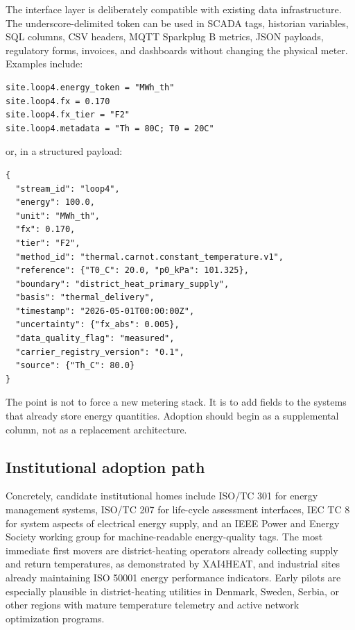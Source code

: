 \documentclass[11pt]{article}
\begin{document}
The interface layer is deliberately compatible with existing data infrastructure. The underscore-delimited token can be used in SCADA tags, historian variables, SQL columns, CSV headers, MQTT Sparkplug B metrics, JSON payloads, regulatory forms, invoices, and dashboards without changing the physical meter. Examples include:

\begin{verbatim}
site.loop4.energy_token = "MWh_th"
site.loop4.fx = 0.170
site.loop4.fx_tier = "F2"
site.loop4.metadata = "Th = 80C; T0 = 20C"
\end{verbatim}

or, in a structured payload:
\begin{verbatim}
{
  "stream_id": "loop4",
  "energy": 100.0,
  "unit": "MWh_th",
  "fx": 0.170,
  "tier": "F2",
  "method_id": "thermal.carnot.constant_temperature.v1",
  "reference": {"T0_C": 20.0, "p0_kPa": 101.325},
  "boundary": "district_heat_primary_supply",
  "basis": "thermal_delivery",
  "timestamp": "2026-05-01T00:00:00Z",
  "uncertainty": {"fx_abs": 0.005},
  "data_quality_flag": "measured",
  "carrier_registry_version": "0.1",
  "source": {"Th_C": 80.0}
}
\end{verbatim}

The point is not to force a new metering stack. It is to add fields to the systems that already store energy quantities. Adoption should begin as a supplemental column, not as a replacement architecture.

\subsection{Institutional adoption path}

Concretely, candidate institutional homes include ISO/TC 301 for energy management systems, ISO/TC 207 for life-cycle assessment interfaces, IEC TC 8 for system aspects of electrical energy supply, and an IEEE Power and Energy Society working group for machine-readable energy-quality tags. The most immediate first movers are district-heating operators already collecting supply and return temperatures, as demonstrated by XAI4HEAT, and industrial sites already maintaining ISO 50001 energy performance indicators. Early pilots are especially plausible in district-heating utilities in Denmark, Sweden, Serbia, or other regions with mature temperature telemetry and active network optimization programs.
\end{document}
